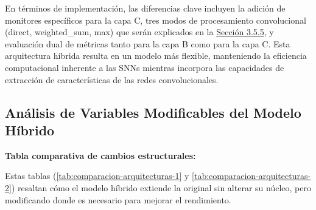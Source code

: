 En términos de implementación, las diferencias clave incluyen la adición de monitores específicos para la capa C, tres modos de procesamiento convolucional (direct, weighted\_sum, max) que serán explicados en la \hyperref[subsec:modos-procesamiento]{Sección 3.5.5}, y evaluación dual de métricas tanto para la capa B como para la capa C. Esta arquitectura híbrida resulta en un modelo más flexible, manteniendo la eficiencia computacional inherente a las SNNs mientras incorpora las capacidades de extracción de características de las redes convolucionales.


\subsection{Análisis de Variables Modificables del Modelo Híbrido}

\textbf{Tabla comparativa de cambios estructurales:}

Estas tablas (\ref{tab:comparacion-arquitecturas-1} y \ref{tab:comparacion-arquitecturas-2}) resaltan cómo el modelo híbrido extiende la original sin alterar su núcleo, pero modificando donde es necesario para mejorar el rendimiento.

